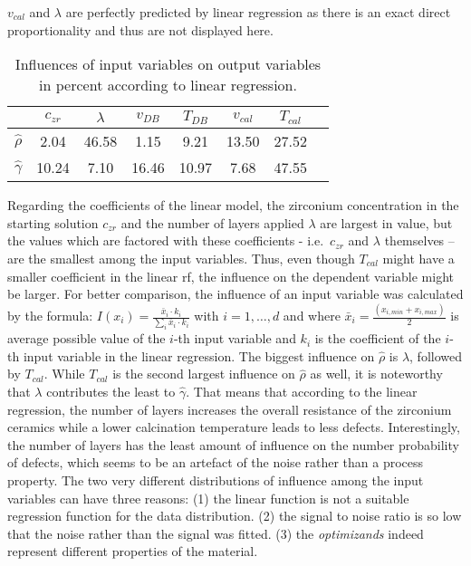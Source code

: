 $v_{cal}$ and $\lambda$ are perfectly predicted by linear regression as there is an exact direct proportionality and thus are not displayed here. 
%
\begin{table}[htb]
	\center
	\begin{tabular}{cccccccc}
		        & $c_{zr}$      & $\lambda$     & $v_{DB}$      & $T_{DB}$      & $v_{cal}$     & $T_{cal}$\\
				\hline\hline
				$\hat\rho$          &2.04   &46.58  &1.15   &9.21   &13.50  &27.52\\
				$\hat\gamma$        &10.24  &7.10   &16.46  &10.97  &7.68   &47.55\\
				\hline\hline
	\end{tabular}
	\label{tab:lin-reg-influence}
	\caption{Influences of input variables on output variables in percent according to linear regression.}
\end{table}

%
Regarding the coefficients of the linear model, the zirconium concentration in the starting solution $c_{zr}$ and the number of layers applied $\lambda$ are largest in value, but the values which are factored with these coefficients - i.e.\, $c_{zr}$ and $\lambda$ themselves -- are the smallest among the input variables. 
Thus, even though $T_{cal}$ might have a smaller coefficient in the linear \gls{rf}, the influence on the dependent variable might be larger. 
For better comparison, the influence of an input variable was calculated by the formula: $I(x_i)=\frac{\bar{x}_i \cdot k_i}{\sum_i \bar{x}_i \cdot k_i}$ with $i=1,\dots,d $ and where $\bar{x}_i= \frac{(x_{i,min}+x_{i,max})}{2}$ is average possible value of the $i$-th input variable and $k_i$ is the coefficient of the $i$-th input variable in the linear regression. 
The biggest influence on $\hat\rho$ is  $\lambda$, followed by $T_{cal}$. 
While $T_{cal}$ is the second largest influence on $\hat\rho$ as well, it is noteworthy that $\lambda$ contributes the least to $\hat\gamma$. 
That means that according to the linear regression, the number of layers increases the overall resistance of the zirconium ceramics while a lower calcination temperature leads to less defects. 
Interestingly, the number of layers has the least amount of influence on the number probability of defects, which seems to be an artefact of the noise rather than a process property. 
The two very different distributions of influence among the input variables can have three reasons:
(1) the linear function is not a suitable regression function for the data distribution.
(2) the signal to noise ratio is so low that the noise rather than the signal was fitted.
(3) the \textit{optimizands} indeed represent different properties of the material.
%

